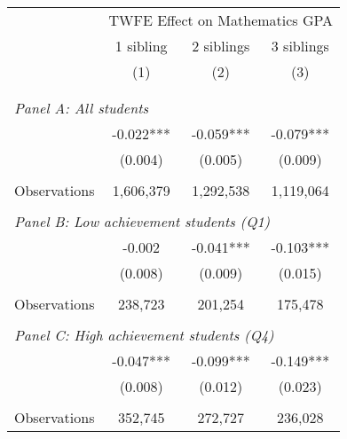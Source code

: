 \makeatletter
{}
{
\makeatother
\begin{tabular}{lccc}
\toprule
\cmidrule(lr){2-4}
& \multicolumn{3}{c}{TWFE Effect on Mathematics GPA} \\
\cmidrule(lr){2-4}
& 1 sibling & 2 siblings & 3 siblings  \\
\cmidrule(lr){2-2} \cmidrule(lr){3-3} \cmidrule(lr){4-4}
& (1) & (2) & (3)\\
\bottomrule
&  &  &  \\
&  &  &   \\
\multicolumn{4}{l}{\textit{Panel A: All students}} \\
\hspace{3mm}        &      -0.022***&      -0.059***&      -0.079***\\
                    &     (0.004)   &     (0.005)   &     (0.009)   \\
                    &               &               &               \\
\hspace{3mm}Observations&   1,606,379   &   1,292,538   &   1,119,064   \\
 
&  &  &   \\
\multicolumn{4}{l}{\textit{Panel B: Low achievement students (Q1)}} \\
\hspace{3mm}        &      -0.002   &      -0.041***&      -0.103***\\
                    &     (0.008)   &     (0.009)   &     (0.015)   \\
                    &               &               &               \\
\hspace{3mm}Observations&     238,723   &     201,254   &     175,478   \\
 
&  &  &   \\
\multicolumn{4}{l}{\textit{Panel C: High achievement students (Q4)}} \\
\hspace{3mm}        &      -0.047***&      -0.099***&      -0.149***\\
                    &     (0.008)   &     (0.012)   &     (0.023)   \\
                    &               &               &               \\
\hspace{3mm}Observations&     352,745   &     272,727   &     236,028   \\
 

\end{tabular}}

